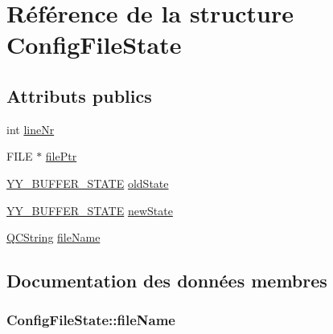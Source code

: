 \hypertarget{struct_config_file_state}{}\section{Référence de la structure Config\+File\+State}
\label{struct_config_file_state}
\subsection*{Attributs publics}
\begin{DoxyCompactItemize}
\item 
int \hyperlink{struct_config_file_state_a41d216c2114d71fa486a48f063a88d16}{line\+Nr}
\item 
F\+I\+L\+E $\ast$ \hyperlink{struct_config_file_state_aa5d616a4c7712d0d7be52d4a56254672}{file\+Ptr}
\item 
\hyperlink{code_8cpp_a4e5bd2d129903df83f3d13effaf8f3e4}{Y\+Y\+\_\+\+B\+U\+F\+F\+E\+R\+\_\+\+S\+T\+A\+T\+E} \hyperlink{struct_config_file_state_aaacb1254715397e72db10477de158e2c}{old\+State}
\item 
\hyperlink{code_8cpp_a4e5bd2d129903df83f3d13effaf8f3e4}{Y\+Y\+\_\+\+B\+U\+F\+F\+E\+R\+\_\+\+S\+T\+A\+T\+E} \hyperlink{struct_config_file_state_a219e8266c897bd4c52c76e0adc04a900}{new\+State}
\item 
\hyperlink{class_q_c_string}{Q\+C\+String} \hyperlink{struct_config_file_state_a412089401b0967a7d7e0204cfadfef78}{file\+Name}
\end{DoxyCompactItemize}


\subsection{Documentation des données membres}
\hypertarget{struct_config_file_state_a412089401b0967a7d7e0204cfadfef78}{}
\subsubsection[{file\+Name}]{ Config\+File\+State\+::file\+Name}\label{struct_config_file_state_a412089401b0967a7d7e0204cfadfef78}
\hypertarget{struct_config_file_state_aa5d616a4c7712d0d7be52d4a56254672}{}
